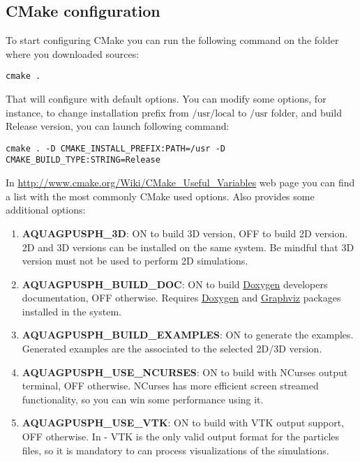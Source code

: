 \subsection{CMake configuration}
\label{sss:install:cmake}
%
To start configuring CMake you can run the following command on the folder 
where you downloaded \NAME sources:
%
\begin{verbatim}
cmake .
\end{verbatim}
%
That will configure \NAME with default options. You can modify some options, 
for instance, to change installation prefix from $\mbox{/usr/local}$ to 
$\mbox{/usr}$ folder, and build Release version, you can launch following 
command:
%
\begin{verbatim}
cmake . -D CMAKE_INSTALL_PREFIX:PATH=/usr -D CMAKE_BUILD_TYPE:STRING=Release
\end{verbatim}
%
In \url{http://www.cmake.org/Wiki/CMake_Useful_Variables} web page you can 
find a list with the most commonly CMake used options. Also \NAME provides 
some additional options:
%
\begin{enumerate}
	\item \textbf{AQUAGPUSPH\_3D}: ON to build 3D \NAME version, OFF to build 
	2D version. \NAME 2D and 3D versions can be installed on the same system. 
	Be mindful that 3D version must not be used to perform 2D simulations.
	\item \textbf{AQUAGPUSPH\_BUILD\_DOC}: ON to build 
	\href{http://www.doxygen.org}{Doxygen} developers documentation, OFF 
	otherwise. Requires \href{http://www.doxygen.org}{Doxygen} and 
	\href{www.graphviz.org}{Graphviz} packages installed in the system.
	\item \textbf{AQUAGPUSPH\_BUILD\_EXAMPLES}: ON to generate the examples. 
	Generated examples are the associated to the selected 2D/3D version.
	\item \textbf{AQUAGPUSPH\_USE\_NCURSES}: ON to build \NAME with NCurses 
	output terminal, OFF otherwise. NCurses has more efficient screen streamed 
	functionality, so you can win some performance using it.
	\item \textbf{AQUAGPUSPH\_USE\_VTK}: ON to build \NAME with VTK output 
	support, OFF otherwise. In \NAME- \VERSION VTK is the only valid output 
	format for the particles files, so it is mandatory to can process 
	visualizations of the simulations.
\end{enumerate}
%

